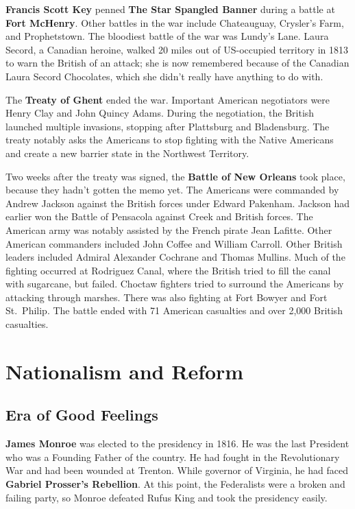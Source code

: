 \textbf{Francis Scott Key} penned \textbf{The Star Spangled Banner} during a battle at \textbf{Fort McHenry}.
Other battles in the war include Chateauguay, Crysler's Farm, and Prophetstown.
The bloodiest battle of the war was Lundy's Lane.
Laura Secord, a Canadian heroine,
walked 20 miles out of US-occupied territory in 1813 to warn the British of an attack;
she is now remembered because of the Canadian Laura Secord Chocolates,
which she didn't really have anything to do with.

The \textbf{Treaty of Ghent} ended the war.
Important American negotiators were Henry Clay and John Quincy Adams.
During the negotiation, the British launched multiple invasions, stopping after Plattsburg and Bladensburg.
The treaty notably asks the Americans to stop fighting with the Native Americans
and create a new barrier state in the Northwest Territory.

Two weeks after the treaty was signed, the \textbf{Battle of New Orleans} took place,
because they hadn't gotten the memo yet.
The Americans were commanded by Andrew Jackson against the British forces under Edward Pakenham.
Jackson had earlier won the Battle of Pensacola against Creek and British forces.
The American army was notably assisted by the French pirate Jean Lafitte.
Other American commanders included John Coffee and William Carroll.
Other British leaders included Admiral Alexander Cochrane and Thomas Mullins.
Much of the fighting occurred at Rodriguez Canal, where the British tried to fill the canal with sugarcane, but failed.
Choctaw fighters tried to surround the Americans by attacking through marshes.
There was also fighting at Fort Bowyer and Fort St.\ Philip.
The battle ended with 71 American casualties and over 2,000 British casualties.

\section{Nationalism and Reform}

\subsection*{Era of Good Feelings}

\textbf{James Monroe} was elected to the presidency in 1816.
He was the last President who was a Founding Father of the country.
He had fought in the Revolutionary War and had been wounded at Trenton.
While governor of Virginia, he had faced \textbf{Gabriel Prosser's Rebellion}.
At this point, the Federalists were a broken and failing party,
so Monroe defeated Rufus King and took the presidency easily.

